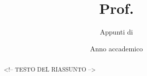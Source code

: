 \documentclass[11pt,a4paper,twoside,titlepage]{article}
\title{\sffamily \NomeCorso\\\vspace{6pt}\Large Prof. \NomeProf\vspace{-8pt}}
\author{\sffamily Appunti di \EdoardoPorcaro}
\date{\sffamily Anno accademico \AnnoAccademico}
\begin{document}
\maketitle
\thispagestyle{empty}
\cleardoublepage

\begin{abstract}
    <!-- TESTO DEL RIASSUNTO -->
\end{abstract}
\thispagestyle{empty}
\cleardoublepage

\tableofcontents
\clearpage
\listoffigures
\clearpage


\end{document}
